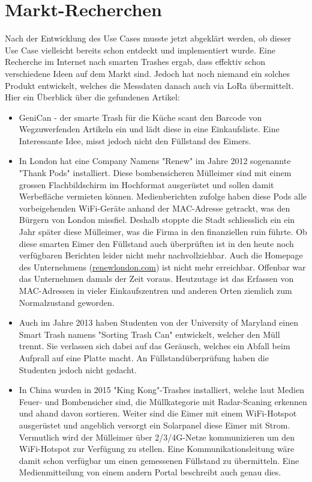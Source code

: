\section{Markt-Recherchen}
Nach der Entwicklung des Use Cases musste jetzt abgeklärt werden, ob dieser Use Case vielleicht bereits schon entdeckt und implementiert wurde. Eine Recherche im Internet nach smarten Trashes ergab, dass effektiv schon verschiedene Ideen auf dem Markt sind. Jedoch hat noch niemand ein solches Produkt entwickelt, welches die Messdaten danach auch via LoRa übermittelt. Hier ein Überblick über die gefundenen Artikel:
\begin{itemize}  
  \item GeniCan\autocite{market:genican} - der smarte Trash für die Küche scant den Barcode von Wegzuwerfenden Artikeln ein und lädt diese in eine Einkaufsliste. Eine Interessante Idee, misst jedoch nicht den Füllstand des Eimers.
  \item In London hat eine Company Namens "Renew" im Jahre 2012 sogenannte "Thank Pods"\autocite{market:LondonBins} installiert. Diese bombensicheren Mülleimer sind mit einem grossen Flachbildschirm im Hochformat ausgerüstet und sollen damit Werbefläche vermieten können. Medienberichten zufolge haben diese Pods alle vorbeigehenden WiFi-Geräte anhand der MAC-Adresse getrackt, was den Bürgern von London missfiel. Deshalb stoppte die Stadt schliesslich ein  ein Jahr später diese Mülleimer\autocite{market:LondonBinsStop}, was die Firma in den finanziellen ruin führte\autocite{market:LondonBinRuin}.
  Ob diese smarten Eimer den Füllstand auch überprüften ist in den heute noch verfügbaren Berichten leider nicht mehr nachvollziehbar. Auch die Homepage des Unternehmens (\url{renewlondon.com}) ist nicht mehr erreichbar. Offenbar war das Unternehmen damals der Zeit voraus. Heutzutage ist das Erfassen von MAC-Adressen in vieler Einkaufszentren und anderen Orten ziemlich zum Normalzustand geworden. 
  \item Auch im Jahre 2013 haben Studenten von der University of Maryland einen Smart Trash namens "Sorting Trash Can"\autocite{market:sortingTrashCan} entwickelt, welcher den Müll trennt. Sie verlassen sich dabei auf das Geräusch, welches ein Abfall beim Aufprall auf eine Platte macht. An Füllstandüberprüfung haben die Studenten jedoch nicht gedacht.
  \item In China wurden in 2015 "King Kong"-Trashes\autocite{market:ChinaTrash} installiert, welche laut Medien Feuer- und Bombensicher sind, die Müllkategorie mit Radar-Scaning erkennen und ahand davon sortieren. Weiter sind die Eimer mit einem WiFi-Hotspot ausgerüstet und angeblich versorgt ein Solarpanel diese Eimer mit Strom. Vermutlich wird der Mülleimer über 2/3/4G-Netze kommunizieren um den WiFi-Hotspot zur Verfügung zu stellen. Eine Kommunikationsleitung wäre damit schon verfügbar um einen gemessenen Füllstand zu übermitteln. Eine Medienmitteilung von einem andern Portal beschreibt auch genau dies\autocite{market:ChinaTrash2}.
  

\end{itemize}
